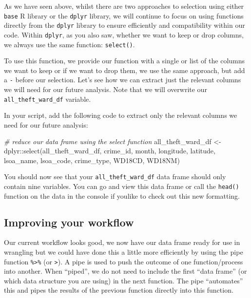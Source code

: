 \documentclass[
]{book}
\newenvironment{Shaded}{\begin{snugshade}}{\end{snugshade}}
\newcommand{\CommentTok}[1]{\textcolor[rgb]{0.56,0.35,0.01}{\textit{#1}}}
\newcommand{\FunctionTok}[1]{\textcolor[rgb]{0.00,0.00,0.00}{#1}}
\newcommand{\NormalTok}[1]{#1}
\newcommand{\OtherTok}[1]{\textcolor[rgb]{0.56,0.35,0.01}{#1}}
\newcommand{\SpecialCharTok}[1]{\textcolor[rgb]{0.00,0.00,0.00}{#1}}
\begin{document}
As we have seen above, whilst there are two approaches to selection using either \texttt{base} R library or the \texttt{dplyr} library, we will continue to focus on using functions directly from the \texttt{dplyr} library to ensure efficiently and compatibility within our code. Within \texttt{dplyr}, as you also saw, whether we want to keep or drop columns, we always use the same function: \texttt{select()}.

To use this function, we provide our function with a single or list of the columns we want to keep or if we want to drop them, we use the same approach, but add a \texttt{-} before our selection. Let's see how we can extract just the relevant columns we will need for our future analysis. Note that we will overwrite our \texttt{all\_theft\_ward\_df} variable.

In your script, add the following code to extract only the relevant columns we need for our future analysis:

\begin{Shaded}
\begin{Highlighting}[]
\CommentTok{\# reduce our data frame using the select function}
\NormalTok{all\_theft\_ward\_df }\OtherTok{\textless{}{-}}\NormalTok{ dplyr}\SpecialCharTok{::}\FunctionTok{select}\NormalTok{(all\_theft\_ward\_df, crime\_id, month, longitude,}
\NormalTok{    latitude, lsoa\_name, lsoa\_code, crime\_type, WD18CD, WD18NM)}
\end{Highlighting}
\end{Shaded}

You should now see that your \texttt{all\_theft\_ward\_df} data frame should only contain nine variables. You can go and view this data frame or call the \texttt{head()} function on the data in the console if youlike to check out this new formatting.

\hypertarget{improving-your-workflow}{%
\subsection{Improving your workflow}\label{improving-your-workflow}}

Our current workflow looks good, we now have our data frame ready for use in wrangling but we could have done this a little more efficiently by using the pipe function \texttt{\%\textgreater{}\%} (or \texttt{\textbar{}\textgreater{}}). A pipe is used to push the outcome of one function/process into another. When ``piped'', we do not need to include the first ``data frame'' (or which data structure you are using) in the next function. The pipe ``automates'' this and pipes the results of the previous function directly into this function.
\end{document}
